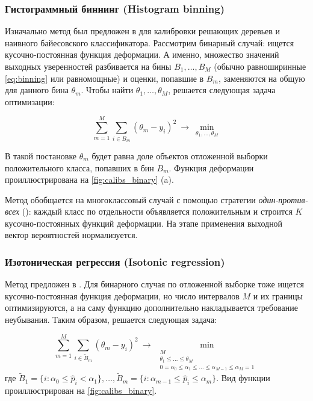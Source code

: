 \documentclass[12pt]{article}
\begin{document}
\subsubsection{Гистограммный биннинг (Histogram binning)}
Изначально метод был предложен в \cite{hist_binning} для калибровки решающих деревьев и наивного байесовского классификатора. Рассмотрим бинарный случай: ищется кусочно-постоянная функция деформации. А именно, множество значений выходных уверенностей разбивается на бины $B_1,\dots,B_M$ (обычно равноширинные \eqref{eq:binning} или равномощные) и оценки, попавшие в $B_m$, заменяются на общую для данного бина $\theta_m$. Чтобы найти $\theta_1,\dots,\theta_M$, решается следующая задача оптимизации:

\begin{equation}\label{eq:hist_binning}
\sum_{m=1}^{M}\sum_{i\in B_m}
\left(\theta_m - y_i\right)^2 \ \to \
\min_{\theta_1,\dots, \theta_M}
\end{equation}

В такой постановке $\theta_m$ будет равна доле объектов отложенной выборки положительного класса, попавших в бин $B_m$. Функция деформации проиллюстрирована на \autoref{fig:calibs_binary} (a). 

Метод обобщается на многоклассовый случай с помощью стратегии \emph{один-против-всех} (): каждый класс по отдельности объявляется положительным и строится $K$ кусочно-постоянных функций деформации. На этапе применения выходной вектор вероятностей нормализуется.


\subsubsection{Изотоническая регрессия (Isotonic regression)}

Метод предложен в \cite{isotonic}. Для бинарного случая по отложенной выборке тоже ищется кусочно-постоянная функция деформации, но число интервалов $M$ и их границы оптимизируются, а на саму функцию дополнительно накладывается требование неубывания. Таким образом, решается следующая задача:

\begin{equation}\label{eq:isotonic}
\sum_{m=1}^{M}\sum_{i\in \tilde{B}_m}
\left(\theta_m - y_i\right)^2 \ \to \
\min_{\substack{
    M \\
    \theta_1 \leqslant \dots \leqslant \theta_M \\
    0=\alpha_0 \leqslant \alpha_1 \leqslant \dots \leqslant \alpha_{M-1} \leqslant \alpha_M = 1
}}
\end{equation}
где 
$\tilde{B}_1 =\{i: \alpha_0 \leqslant \hat{p}_i < \alpha_1\},
\dots,
\tilde{B}_{m} =\{i: \alpha_{m-1} \leqslant \hat{p}_i \leqslant \alpha_m\}$. Вид функции проиллюстрирован на \autoref{fig:calibs_binary}.
\end{document}
